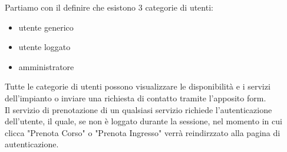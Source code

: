Partiamo con il definire che esistono 3 categorie di utenti:
\begin{itemize}
    \item utente generico
    \item utente loggato
    \item amministratore
\end{itemize}
Tutte le categorie di utenti possono visualizzare le disponibilità e i servizi dell'impianto o inviare una richiesta di contatto
tramite l'apposito form.\\
Il servizio di prenotazione di un qualsiasi servizio richiede l'autenticazione dell'utente, il quale, se
non è loggato durante la sessione, nel momento in cui clicca "Prenota Corso" o "Prenota Ingresso" verrà reindirzzato alla pagina
di autenticazione.